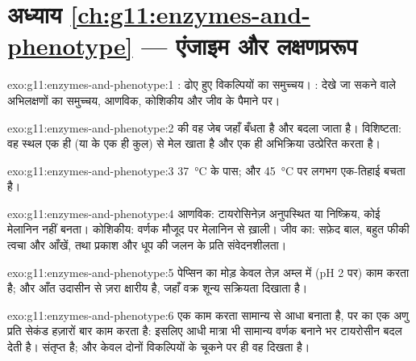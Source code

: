 \section*{अध्याय \ref{ch:g11:enzymes-and-phenotype} --- एंजाइम और लक्षणप्ररूप}

\begin{solution}{exo:g11:enzymes-and-phenotype:1}
: ढोए हुए विकल्पियों का समुच्चय। : देखे जा सकने वाले
अभिलक्षणों का समुच्चय, आणविक, कोशिकीय और जीव के पैमाने पर।
\end{solution}

\begin{solution}{exo:g11:enzymes-and-phenotype:2}
 की वह जेब जहाँ  बँधता है और बदला जाता है। विशिष्टता: वह
स्थल एक ही  (या  के एक ही कुल) से मेल खाता है और एक ही
अभिक्रिया उत्प्रेरित करता है।
\end{solution}

\begin{solution}{exo:g11:enzymes-and-phenotype:3}
\qty{37}{\celsius} के पास; और \qty{45}{\celsius} पर लगभग एक-तिहाई बचता है।
\end{solution}

\begin{solution}{exo:g11:enzymes-and-phenotype:4}
आणविक: टायरोसिनेज़ अनुपस्थित या निष्क्रिय, कोई मेलानिन नहीं बनता। कोशिकीय:
वर्णक  मौजूद पर मेलानिन से ख़ाली। जीव का: सफ़ेद बाल, बहुत फीकी
त्वचा और आँखें, तथा प्रकाश और धूप की जलन के प्रति संवेदनशीलता।
\end{solution}

\begin{solution}{exo:g11:enzymes-and-phenotype:5}
पेप्सिन का मोड़ केवल तेज़ अम्ल में (pH 2 पर) काम करता है; और आँत उदासीन से
ज़रा क्षारीय है, जहाँ वक्र शून्य सक्रियता दिखाता है।
\end{solution}

\begin{solution}{exo:g11:enzymes-and-phenotype:6}
एक काम करता  सामान्य से आधा  बनाता है, पर  का एक अणु
प्रति सेकंड हज़ारों बार काम करता है: इसलिए आधी मात्रा भी सामान्य वर्णक
बनाने भर टायरोसीन बदल देती है।  संतृप्त है; और केवल दोनों
विकल्पियों के चूकने पर ही वह दिखता है।
\end{solution}

